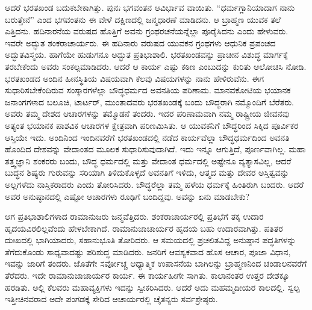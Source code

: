 ಆದರೆ ಭರತಖಂಡ ಬದುಕಬೇಕಾಗಿತ್ತು. ಪುನಃ ಭಗವಂತನ ಆವಿರ್ಭಾವ ವಾಯಿತು. “ಧರ್ಮಗ್ಲಾನಿಯಾದಾಗ ನಾನು ಬರುತ್ತೇನೆ” ಎಂದ ಭಗವಂತನು ಈ ವೇಳೆ ದಕ್ಷಿಣದಲ್ಲಿ ಜನ್ಮಧಾರಣೆ ಮಾಡಿದನು. ಆ ಬ್ರಾಹ್ಮಣ ಯುವಕ ತಲೆ ಎತ್ತಿದನು. ಹದಿನಾರನೆಯ ವರುಷದ ಹೊತ್ತಿಗೆ ಅವನು ಗ್ರಂಥರಚನೆಯನ್ನೆಲ್ಲಾ ಪೂರೈಸಿದನು ಎಂದು ಹೇಳುವರು. ಇವರೇ ಅದ್ಭುತ ಶಂಕರಾಚಾರ್ಯರು. ಈ ಹದಿನಾರು ವರುಷದ ಯುವಕನ ಗ್ರಂಥಗಳು ಆಧುನಿಕ ಪ್ರಪಂಚದ ಅದ್ಭುತವಿಸ್ಮಯ. ಹಾಗೆಯೇ ಹುಡುಗನೂ ಅದ್ಭುತ ಪ್ರತಿಭಾಶಾಲಿ. ಭರತಖಂಡವನ್ನು ಪ್ರಾಚೀನ ವಿಶುದ್ಧ ಮಾರ್ಗಕ್ಕೆ ತರಬೇಕೆಂದು ಅವರು ಸಂಕಲ್ಪಮಾಡಿದರು. ಆದರೆ ಆ ಕಾರ್ಯ ಎಷ್ಟು ಕಠಿಣ ಎಂಬುದನ್ನು ಕುರಿತು ಆಲೋಚಿಸಿ ನೋಡಿ. ಭರತಖಂಡದ ಅಂದಿನ ಹೀನಸ್ಥಿತಿಯ ವಿಷಯವಾಗಿ ಕೆಲವು ವಿಷಯಗಳನ್ನು ನಾನು ಹೇಳಿರುವೆನು. ಈಗ ಸುಧಾರಿಸಬೇಕೆಂದಿರುವ ಸಂಸ್ಕಾರಗಳೆಲ್ಲಾ ಬೌದ್ಧಧರ್ಮದ ಅವನತಿಯ ಪರಿಣಾಮ. ಮಾನವಕೋಟಿಯ ಭಯಾನಕ ಜನಾಂಗಗಳಾದ ಬಲೂಚಿ, ಟಾರ್ಟರ್​, ಮುಂತಾದವರು ಭರತಖಂಡಕ್ಕೆ ಬಂದು ಬೌದ್ಧರಾಗಿ ನಮ್ಮೊಂದಿಗೆ ಬೆರೆತರು. ಅವರು ತಮ್ಮ ದೇಶದ ಆಚಾರಗಳನ್ನು ತಮ್ಮೊಡನೆ ತಂದರು. ಇದರ ಪರಿಣಾಮವಾಗಿ ನಮ್ಮ ರಾಷ್ಟ್ರೀಯ ಜೀವನವು ಅತ್ಯಂತ ಭಯಾನಕ ಪಾಶವಿಕ ಆಚಾರಗಳ ಕ್ಷೇತ್ರವಾಗಿ ಪರಿಣಮಿಸಿತು. ಆ ಯುವಕನಿಗೆ ಬೌದ್ಧರಿಂದ ಸಿಕ್ಕಿದ ಪೂರ್ವಿಕರ ಆಸ್ತಿಯೇ ಇದು. ಅಂದಿನಿಂದ ಇಂದಿನವರೆಗೆ ಭರತಖಂಡದಲ್ಲಿ ನಡೆದ ಕಾರ್ಯವೆಲ್ಲಾ ಬೌದ್ಧಧರ್ಮದಿಂದ ಅವನತಿ ಹೊಂದಿದ ದೇಶವನ್ನು ವೇದಾಂತದ ಮೂಲಕ ಸುಧಾರಿಸುವುದಾಗಿದೆ. ಇದು ಇನ್ನೂ ಆಗುತ್ತಿದೆ, ಪೂರ್ಣವಾಗಿಲ್ಲ. ಮಹಾ ತತ್ತ್ವಜ್ಞಾನಿ ಶಂಕರರು ಬಂದು, ಬೌದ್ಧ ಧರ್ಮದಲ್ಲಿ ಮತ್ತು ವೇದಾಂತ ಧರ್ಮದಲ್ಲಿ ಅಷ್ಟೇನೂ ವ್ಯತ್ಯಾಸವಿಲ್ಲ, ಆದರೆ ಬುದ್ಧನ ಶಿಷ್ಯರು ಗುರುವನ್ನು ಸರಿಯಾಗಿ ತಿಳಿದುಕೊಳ್ಳದೆ ಅವನತಿಗೆ ಇಳಿದು, ಆತ್ಮದ ಮತ್ತು ದೇವರ ಅಸ್ತಿತ್ವವನ್ನು ಅಲ್ಲಗಳೆದು ನಾಸ್ತಿಕರಾದರು ಎಂದು ತೋರಿಸಿದರು. ಬೌದ್ಧರೆಲ್ಲಾ ತಮ್ಮ ಹಳೆಯ ಧರ್ಮಕ್ಕೆ ಹಿಂತಿರುಗಿ ಬಂದರು. ಆದರೆ ಅವರ ಅನುಷ್ಠಾನದಲ್ಲಿ ಎಷ್ಟೋ ಆಚಾರಗಳು ರೂಢಿಗೆ ಬಂದಿದ್ದವು. ಅವನ್ನು ಏನು ಮಾಡಬೇಕು?

ಆಗ ಪ್ರತಿಭಾಶಾಲಿಗಳಾದ ರಾಮಾನುಜರು ಜನ್ಮವೆತ್ತಿದರು. ಶಂಕರಾಚಾರ್ಯರಲ್ಲಿ ಪ್ರತಿಭೆಗೆ ತಕ್ಕ ಉದಾರ ಹೃದಯವಿರಲಿಲ್ಲವೆಂದು ಹೇಳಬೇಕಾಗಿದೆ. ರಾಮಾನುಜಾಚಾರ್ಯರ ಹೃದಯ ಬಹು ಉದಾರವಾಗಿತ್ತು. ಪತಿತರ ದುಃಖದಲ್ಲಿ ಭಾಗಿಯಾದರು, ಸಹಾನುಭೂತಿ ತೋರಿದರು. ಆ ಸಮಯದಲ್ಲಿ ಪ್ರಚಲಿತವಿದ್ದ ಅನುಷ್ಠಾನ ಪದ್ಧತಿಗಳನ್ನು ತೆಗೆದುಕೊಂಡು ಸಾಧ್ಯವಾದಷ್ಟು ಪರಿಶುದ್ಧ ಮಾಡಿದರು. ಜನರಿಗೆ ಆವಶ್ಯಕವಾದ ಹೊಸ ಆಚಾರ, ಪೂಜಾ ವಿಧಾನ, ಇವನ್ನು ಜಾರಿಗೆ ತಂದರು. ಜೊತೆಗೇ ಸರ್ವೋಚ್ಚ ಆಧ್ಯಾತ್ಮಿಕ ಉಪಾಸನೆಯ ಬಾಗಿಲನ್ನು ಬ್ರಾಹ್ಮಣನಿಂದ ಚಂಡಾಲನವರೆಗೆ ತೆರೆದರು. ಇದೇ ರಾಮಾನುಜಾಚಾರ್ಯರ ಕಾರ್ಯ. ಈ ಕಾರ್ಯಹೀಗೇ ಸಾಗಿತು. ಕಾಲಾನಂತರ ಉತ್ತರ ದೇಶಕ್ಕೂ ಹರಡಿತು. ಅಲ್ಲಿ ಕೆಲವರು ಮಹಾವ್ಯಕ್ತಿಗಳು ಇದನ್ನು ಸ್ವೀಕರಿಸಿದರು. ಆದರೆ ಅದು ಮಹಮ್ಮದೀಯರ ಕಾಲದಲ್ಲಿ. ಸ್ವಲ್ಪ ಇತ್ತೀಚಿನವರಾದ ಅದೇ ಪಂಗಡಕ್ಕೆ ಸೇರಿದ ಆಚಾರ್ಯರಲ್ಲಿ ಚೈತನ್ಯರು ಸರ್ವಶ್ರೇಷ್ಠರು.

